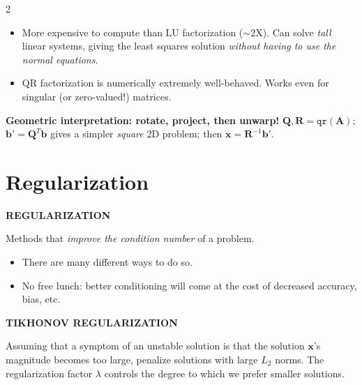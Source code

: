 \documentclass[a4paper,9pt]{extarticle}
\begin{document}
\begin{multicols}{2}
\begin{summary}
\begin{itemize}
\item More expensive to compute than LU factorization ($\sim$2X). Can solve \emph{tall} linear
systems, giving the least squares solution \emph{without having to use the normal equations}.

\item QR factorization is numerically extremely well-behaved. Works even for singular (or
zero-valued!) matrices.

\end{itemize}

\end{summary}


\begin{important}

\textbf{Geometric interpretation: rotate, project, then unwarp!}
$\mathbf{Q}, \mathbf{R} = \texttt{qr}(\mathbf{A})$; $\mathbf{b}' = \mathbf{Q}^T\mathbf{b}$ gives
a simpler \emph{square} 2D problem; then $\mathbf{x} = \mathbf{R}^{-1}\mathbf{b}'$.

\end{important}



\section{Regularization}


\begin{definition}

\textbf{REGULARIZATION}

Methods that \emph{improve the condition number} of a problem.

\begin{itemize}

\item There are many different ways to do so.

\item No free lunch: better conditioning will come at the cost of decreased accuracy, bias, etc.

\end{itemize}

\end{definition}


\begin{definition}

\textbf{TIKHONOV REGULARIZATION}

Assuming that a symptom of an unstable solution is that the solution $\mathbf{x}$'s magnitude
becomes too large, penalize solutions with large $L_2$ norms. The regularization factor
$\lambda$ controls the degree to which we prefer smaller solutions.


\end{definition}
\end{multicols}
\end{document}
